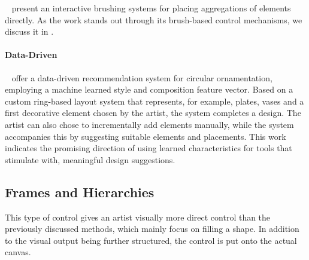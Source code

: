 \citeauthor*{hsu_2020_aef}~\cite{hsu_2020_aef} present an interactive brushing systems for placing aggregations of elements directly. As the work stands out through its brush-based control mechanisms, we discuss it in .


\paragraph*{Data-Driven}
\label{para:analysis_element_arrangements_datadriven}

\citeauthor*{phan_2016_ple}~\cite{phan_2016_ple} offer a data-driven recommendation system for circular ornamentation, employing a machine learned style and composition feature vector. Based on a custom ring-based layout system that represents, for example, plates, vases and a first decorative element chosen by the artist, the system completes a design. The artist can also chose to incrementally add elements manually, while the system accompanies this by suggesting suitable elements and placements. This work indicates the promising direction of using learned characteristics for tools that stimulate with, \eg meaningful design suggestions.


\subsection{Frames and Hierarchies}
\label{subsec:analysis_frames_and_hierarchies}

 This type of control gives an artist visually more direct control than the previously discussed methods, which mainly focus on filling a shape. In addition to the visual output being further structured, the control is put onto the actual canvas.

